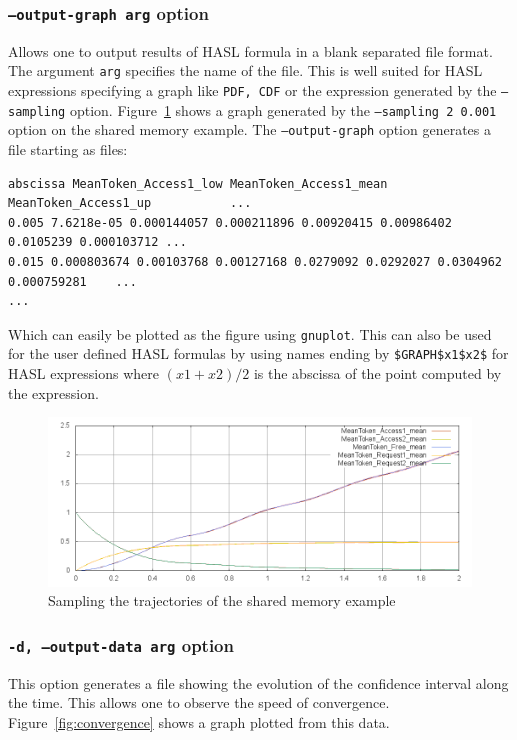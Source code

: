 \documentclass{article}
\begin{document}
\subsubsection{\texttt{--output-graph arg} option}
Allows one to output results of HASL formula in a blank separated file
format. The argument \texttt{arg} specifies the name of the file.  This
is well suited for HASL expressions specifying a graph like
\texttt{PDF, CDF} or the expression generated by the
\texttt{--sampling} option.  Figure~\ref{fig:sampling} shows a graph
generated by the \texttt{--sampling 2 0.001} option on the shared
memory example. The \texttt{--output-graph} option generates a file
starting as files:
\begin{scriptsize}
\begin{verbatim}
abscissa MeanToken_Access1_low MeanToken_Access1_mean MeanToken_Access1_up           ... 
0.005 7.6218e-05 0.000144057 0.000211896 0.00920415 0.00986402 0.0105239 0.000103712 ...
0.015 0.000803674 0.00103768 0.00127168 0.0279092 0.0292027 0.0304962 0.000759281    ...
...
\end{verbatim}
\end{scriptsize}
Which can easily be plotted as the figure using \texttt{gnuplot}.
{\color{red}This can also be used for the user defined HASL formulas by using names ending by
\verb|$GRAPH$x1$x2$| for HASL expressions where $(x1+x2)/2$ is the
abscissa of the point computed by the expression.}

\begin{figure}[h]
  \centering
  \includegraphics[width=1.01\textwidth]{figures/sampling.png}
  \caption{Sampling the trajectories of the shared memory example}
  \label{fig:sampling}
\end{figure}

\subsubsection{\texttt{-d, --output-data arg} option}
This option generates a file showing the evolution of the confidence
interval along the time. This allows one to observe the speed of
convergence. Figure~\ref{fig:convergence} shows a graph plotted from
this data.
\end{document}
